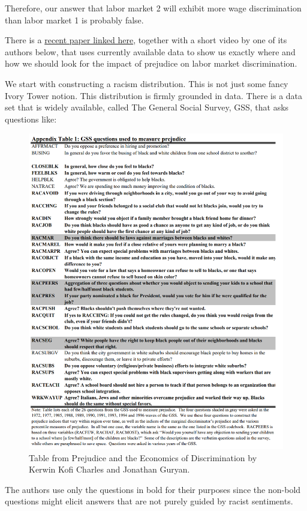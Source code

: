 \documentclass[
]{book}
\begin{document}
Therefore, our answer that labor market 2 will exhibit more wage discrimination than labor market 1 is probably false.

There is a \href{https://papers.ssrn.com/sol3/papers.cfm?abstract_id=1073644}{recent paper linked here}, together with a short video by one of its authors below, that uses currently available data to show us exactly where and how we should look for the impact of prejudice on labor market discrimination.

We start with constructing a racism distribution. This is not just some fancy Ivory Tower notion. This distribution is firmly grounded in data. There is a data set that is widely available, called The General Social Survey, GSS, that asks questions like:

\begin{figure}

{\centering \includegraphics[width=0.8\linewidth]{img/intro/gssquestions} 

}

\caption{Table from Prejudice and the Economics of Discrimination by Kerwin Kofi Charles and Jonathan Guryan.}\label{fig:gssquestions}
\end{figure}

The authors use only the questions in bold for their purposes since the non-bold questions might elicit answers that are not purely guided by racist sentiments.
\end{document}
